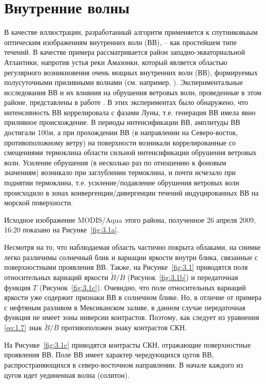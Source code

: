 \section{Внутренние волны} \label{sec:3.1}


В качестве иллюстрации, разработанный алгоритм применяется к спутниковыым оптическим изображениям внутренних волн (ВВ), -- как простейшем типе течений. В качестве примера рассматривается район западно-экваториальной Атлантики, напротив устья реки Амазонки, который является областью регулярного возникновения очень мощных внутренних волн (ВВ), формируемых полусуточными приливными волнами (см. например, \citep{Ivanov1993}). Экспериментальные исследования ВВ и их влияния на обрушения ветровых волн, проведенные в этом районе, представлены в работе \citep{1986}. В этих экспериментах было обнаружено, что интенсивность ВВ коррелировала с фазами Луны, т.е. генерация ВВ имела явно приливное происхождение. В периоды интенсификации ВВ, амплитуды ВВ достигали 100\textit{м}, а при прохождении ВВ (в направлении на Северо-восток, противоположному ветру) на поверхности возникали коррелированные со смещениями термоклина области сильной интенсификации обрушения ветровых волн. Усиление обрушения (в несколько раз по отношению к фоновым значениям) возникало при заглублении термоклина, и почти исчезало при поднятии термоклина, т.е. усиление/подавление обрушения ветровых волн происходило в зонах конвергенции/дивергенции течений индуцированных ВВ на морской поверхности. 

Исходное изображение MODIS/Aqua этого района, полученное 26 апреля 2009, 16:20 показано на Рисунке~\ref{fig:3.1a}.

Несмотря на то, что наблюдаемая область частично покрыта облаками, на снимке легко различимы солнечный блик и вариации яркости внутри блика, связанные с поверхностными проявления ВВ. Также, на Рисунке~\ref{fig:3.1} приводятся поля относительных вариаций яркости $\widetilde{B}/\overline{B}$ (Рисунок~\ref{fig:3.1b}) и передаточная функция $T$ (Рисунок~\ref{fig:3.1c}). Очевидно, что поле относительных вариаций яркости уже содержит признаки ВВ в солнечном блике. Но, в отличие от примера с нефтяным разливом в Мексиканском заливе, в данном случае передаточная функция не имеет зоны инверсии контрастов. Поэтому, как следует из уравнения \eqref{eq:1.7} знак $\widetilde{B}/\overline{B}$ противоположен знаку контрастов СКН.

На Рисунке~\ref{fig:3.1c} приводятся контрасты СКН, отражающие поверхностные проявления ВВ. Поле ВВ имеет характер чередующихся цугов ВВ, распространяющихся в северо-восточном направлении. В начале каждого из цугов идет уединенная волна (солитон).

